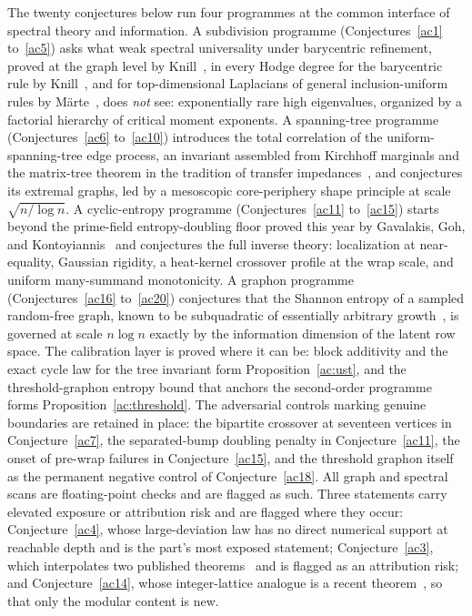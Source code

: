 \documentclass[11pt]{article}
\theoremstyle{definition}
\begin{document}
The twenty conjectures below run four programmes at the common interface of spectral theory and information.  A subdivision programme (Conjectures~\ref{ac1} to~\ref{ac5}) asks what weak spectral universality under barycentric refinement, proved at the graph level by Knill~\cite{Kn15a,Kn15b}, in every Hodge degree for the barycentric rule by Knill~\cite{Kn17}, and for top-dimensional Laplacians of general inclusion-uniform rules by M\"arte~\cite{Mar22}, does \emph{not} see: exponentially rare high eigenvalues, organized by a factorial hierarchy of critical moment exponents.  A spanning-tree programme (Conjectures~\ref{ac6} to~\ref{ac10}) introduces the total correlation of the uniform-spanning-tree edge process, an invariant assembled from Kirchhoff marginals and the matrix-tree theorem in the tradition of transfer impedances~\cite{BP93}, and conjectures its extremal graphs, led by a mesoscopic core-periphery shape principle at scale $\sqrt{n/\log n}$.  A cyclic-entropy programme (Conjectures~\ref{ac11} to~\ref{ac15}) starts beyond the prime-field entropy-doubling floor proved this year by Gavalakis, Goh, and Kontoyiannis~\cite{GGK26} and conjectures the full inverse theory: localization at near-equality, Gaussian rigidity, a heat-kernel crossover profile at the wrap scale, and uniform many-summand monotonicity.  A graphon programme (Conjectures~\ref{ac16} to~\ref{ac20}) conjectures that the Shannon entropy of a sampled random-free graph, known to be subquadratic of essentially arbitrary growth~\cite{HN13}, is governed at scale $n\log n$ exactly by the information dimension of the latent row space.  The calibration layer is proved where it can be: block additivity and the exact cycle law for the tree invariant form Proposition~\ref{ac:ust}, and the threshold-graphon entropy bound that anchors the second-order programme forms Proposition~\ref{ac:threshold}.  The adversarial controls marking genuine boundaries are retained in place: the bipartite crossover at seventeen vertices in Conjecture~\ref{ac7}, the separated-bump doubling penalty in Conjecture~\ref{ac11}, the onset of pre-wrap failures in Conjecture~\ref{ac15}, and the threshold graphon itself as the permanent negative control of Conjecture~\ref{ac18}.  All graph and spectral scans are floating-point checks and are flagged as such.  Three statements carry elevated exposure or attribution risk and are flagged where they occur: Conjecture~\ref{ac4}, whose large-deviation law has no direct numerical support at reachable depth and is the part's most exposed statement; Conjecture~\ref{ac3}, which interpolates two published theorems~\cite{Mar22,Kn17} and is flagged as an attribution risk; and Conjecture~\ref{ac14}, whose integer-lattice analogue is a recent theorem~\cite{CS25}, so that only the modular content is new.
\end{document}
